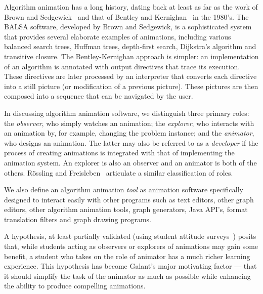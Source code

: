 Algorithm animation has a long history, dating back at least as far as the
work of Brown and Sedgewick~\cite{1988-Computer-Brown,1985-IEEE_Software-Brown}
and that of Bentley and Kernighan~\cite{1987-Animation-Bentley} in the 1980's.
The BALSA software, developed by Brown and Sedgewick, is a sophisticated system that provides several
elaborate examples of animations, including various balanced search trees,
Huffman trees, depth-first search, Dijkstra's algorithm and transitive closure.
The Bentley-Kernighan approach is simpler: an implementation of an algorithm is annotated with output directives that trace its execution.
These directives are later processed by an interpreter that
converts each directive into a still picture (or modification of a previous
picture). These pictures are then composed into a sequence that can be navigated by the user.

In discussing algorithm animation software,
we distinguish three primary roles: the \emph{observer}, who simply
watches an animation; the \emph{explorer}, who interacts with an animation by,
for example, changing the problem instance; and the \emph{animator}, who
designs an animation. The latter may also be referred to as a
\emph{developer} if the process of creating animations is integrated with
that of implementing the animation system. An explorer is also an observer
and an animator is both of
the others.
R\"ossling and Freisleben~\cite{2002-JVLC-Roessling} articulate a similar
classification of roles.

We also define an algorithm animation \emph{tool} as animation software specifically designed to interact easily with other programs such as
text editors, other graph editors, other algorithm animation tools,
graph generators, Java API's, format translation filters and
graph drawing programs.

A hypothesis, at least partially validated (using student attitude
surveys~\cite{1997-SIGCSE-Stasko}) posits that,
while students acting as observers or explorers of animations may gain some benefit,
a student who takes on the role of animator has a much richer learning
experience.
This hypothesis has become Galant's major motivating factor --- that it should
simplify the task of the animator as much as possible while enhancing
the ability to produce compelling animations.


